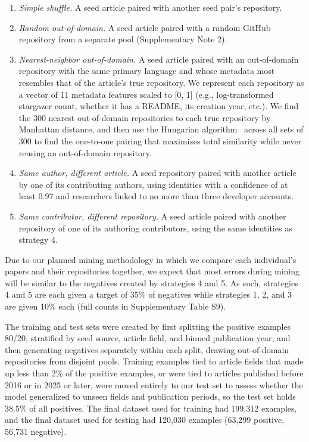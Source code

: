 \documentclass[pdflatex,sn-nature]{sn-jnl}%
\begin{document}
\begin{enumerate}
\item \emph{Simple shuffle.} A seed article paired with another seed pair's repository.
\item \emph{Random out-of-domain.} A seed article paired with a random GitHub repository from a separate pool (Supplementary Note 2).
\item \emph{Nearest-neighbor out-of-domain.} A seed article paired with an out-of-domain repository with the same primary language and whose metadata most resembles that of the article's true repository. We represent each repository as a vector of 11 metadata features scaled to [0, 1] (e.g., log-transformed stargazer count, whether it has a README, its creation year, etc.). We find the 300 nearest out-of-domain repositories to each true repository by Manhattan distance, and then use the Hungarian algorithm~\cite{crouse2016implementing} across all sets of 300 to find the one-to-one pairing that maximizes total similarity while never reusing an out-of-domain repository.
\item \emph{Same author, different article.} A seed repository paired with another article by one of its contributing authors, using identities with a confidence of at least 0.97 and researchers linked to no more than three developer accounts.
\item \emph{Same contributor, different repository.} A seed article paired with another repository of one of its authoring contributors, using the same identities as strategy 4.
\end{enumerate}

\noindent Due to our planned mining methodology in which we compare each individual's papers and their repositories together, we expect that most errors during mining will be similar to the negatives created by strategies 4 and 5.
As such, strategies 4 and 5 are each given a target of 35\% of negatives while strategies 1, 2, and 3 are given 10\% each (full counts in Supplementary Table S9).

The training and test sets were created by first splitting the positive examples 80/20, stratified by seed source, article field, and binned publication year, and then generating negatives separately within each split, drawing out-of-domain repositories from disjoint pools.
Training examples tied to article fields that made up less than 2\% of the positive examples, or were tied to articles published before 2016 or in 2025 or later, were moved entirely to our test set to assess whether the model generalized to unseen fields and publication periods, so the test set holds 38.5\% of all positives.
The final dataset used for training had 199,312 examples, and the final dataset used for testing had 120,030 examples (63,299 positive, 56,731 negative).
\end{document}
